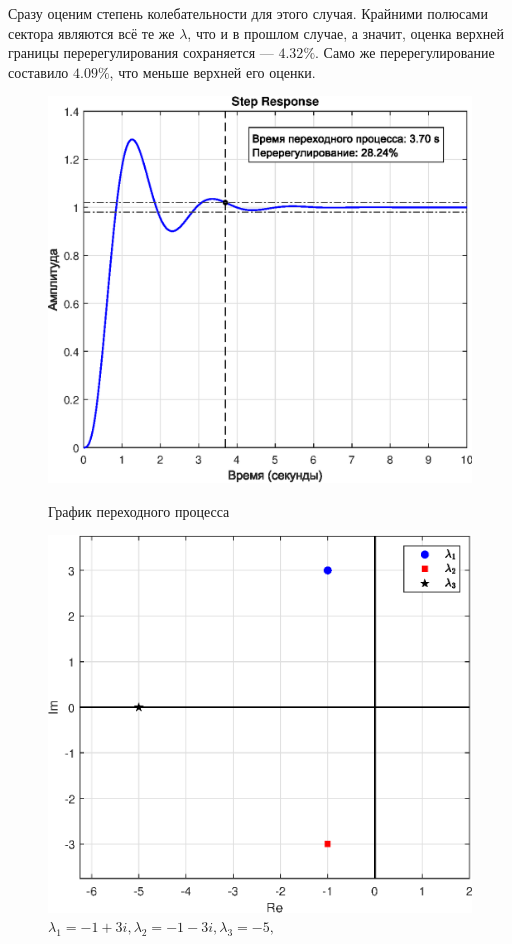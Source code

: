 \documentclass[a4paper]{article}
\begin{document}
Сразу оценим степень колебательности для этого случая. Крайними полюсами сектора являются всё те же $\lambda$, что и в прошлом случае, а значит, оценка верхней границы перерегулирования сохраняется --- $4.32\%$. Само же перерегулирование составило $4.09\%$, что меньше верхней его оценки. 

\begin{figure}[H]
    \begin{minipage}{0.5\textwidth}
        \centering \includegraphics[width=\textwidth]{ex2/-1+3i_-1-3i_-5.eps}
        \caption{$\lambda_1=-1+3i, \lambda_2=-1-3i, \lambda_3=-5,$}
        \centerline{График переходного процесса}
    \end{minipage}\hfill
    \begin{minipage}{0.5\textwidth}
        \centering \includegraphics[width=\textwidth]{ex2/complex_plan_-1+3i_-1-3i_-5.eps}

\end{minipage}
\end{figure}
\end{document}
